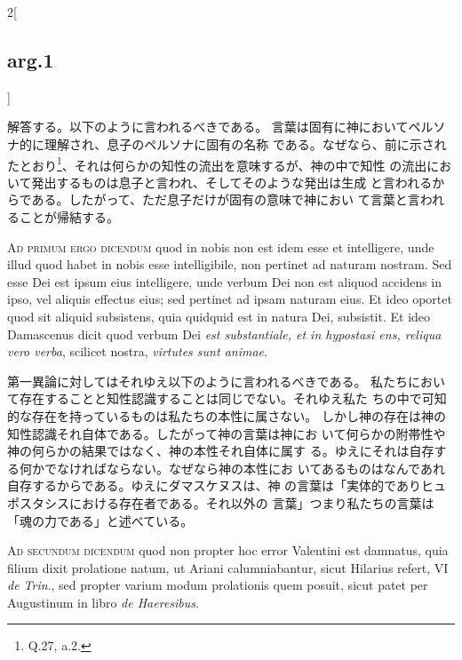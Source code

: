 \documentclass[paper=a4paper,fontsize=10pt,jafontsize=9pt,titlepage]{jlreq}
\begin{document}
\begin{paracol}{2}[\subsection{arg.1}]
\switchcolumn

解答する。以下のように言われるべきである。
言葉は固有に神においてペルソナ的に理解され、息子のペルソナに固有の名称
 である。なぜなら、前に示されたとおり\footnote{Q.27, a.2.}、それは何らかの知性の流出を意味するが、神の中で知性
 の流出において発出するものは息子と言われ、そしてそのような発出は生成
 と言われるからである。したがって、ただ息子だけが固有の意味で神におい
 て言葉と言われることが帰結する。

\switchcolumn*[\subsection{ad.1}]

{\scshape Ad primum ergo dicendum} quod in nobis non est idem esse et
intelligere, unde illud quod habet in nobis esse intelligibile, non
pertinet ad naturam nostram. Sed esse Dei est ipsum eius intelligere,
unde verbum Dei non est aliquod accidens in ipso, vel aliquis effectus
eius; sed pertinet ad ipsam naturam eius. Et ideo oportet quod sit
aliquid subsistens, quia quidquid est in natura Dei, subsistit. Et
ideo Damascenus dicit quod verbum Dei {\itshape est substantiale, et in
hypostasi ens, reliqua vero verba}, scilicet nostra, {\itshape virtutes sunt
animae}.

\switchcolumn

第一異論に対してはそれゆえ以下のように言われるべきである。
私たちにおいて存在することと知性認識することは同じでない。それゆえ私た
 ちの中で可知的な存在を持っているものは私たちの本性に属さない。
しかし神の存在は神の知性認識それ自体である。したがって神の言葉は神にお
 いて何らかの附帯性や神の何らかの結果ではなく、神の本性それ自体に属す
 る。ゆえにそれは自存する何かでなければならない。なぜなら神の本性にお
 いてあるものはなんであれ自存するからである。ゆえにダマスケヌスは、神
 の言葉は「実体的でありヒュポスタシスにおける存在者である。それ以外の
 言葉」つまり私たちの言葉は「魂の力である」と述べている。

\switchcolumn*[\subsection{ad.2}]

{\scshape Ad secundum dicendum} quod non propter hoc error Valentini est
damnatus, quia filium dixit prolatione natum, ut Ariani
calumniabantur, sicut Hilarius refert, VI {\itshape de Trin}., sed propter varium
modum prolationis quem posuit, sicut patet per Augustinum in libro {\itshape de
Haeresibus}.


\end{paracol}
\end{document}
